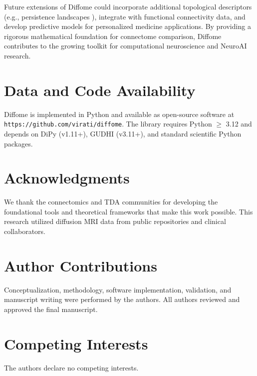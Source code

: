 \documentclass[12pt,a4paper]{article}
\begin{document}
Future extensions of Diffome could incorporate additional topological descriptors (e.g., persistence landscapes \citep{bubenik2015statistical}), integrate with functional connectivity data, and develop predictive models for personalized medicine applications. By providing a rigorous mathematical foundation for connectome comparison, Diffome contributes to the growing toolkit for computational neuroscience and NeuroAI research.

\section*{Data and Code Availability}

Diffome is implemented in Python and available as open-source software at \texttt{https://github.com/virati/diffome}. The library requires Python $\geq$ 3.12 and depends on DiPy (v1.11+), GUDHI (v3.11+), and standard scientific Python packages.

\section*{Acknowledgments}

We thank the connectomics and TDA communities for developing the foundational tools and theoretical frameworks that make this work possible. This research utilized diffusion MRI data from public repositories and clinical collaborators.

\section*{Author Contributions}

Conceptualization, methodology, software implementation, validation, and manuscript writing were performed by the authors. All authors reviewed and approved the final manuscript.

\section*{Competing Interests}

The authors declare no competing interests.
\end{document}
